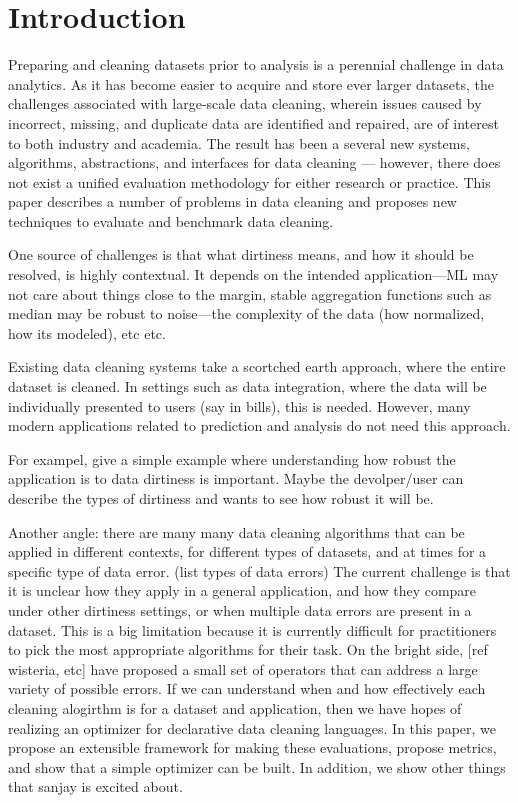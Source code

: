 \section{Introduction}
Preparing and cleaning datasets prior to analysis is a perennial challenge in data analytics. As it has become easier to acquire and store ever larger datasets, the challenges associated with large-scale data cleaning, wherein issues caused by incorrect, missing, and duplicate data are identified and repaired, are of interest to both industry and academia. The result has been a several new systems, algorithms, abstractions, and interfaces for data cleaning --- however, there does not exist a unified evaluation methodology for either research or practice. This paper describes a number of problems in data cleaning and proposes new techniques to evaluate and benchmark data cleaning.

One source of challenges is that what dirtiness means, and how it should be resolved, is highly contextual.  It depends on the intended application---ML may not care about things close to the margin, stable aggregation functions such as median may be robust to noise---the complexity of the data (how normalized, how its modeled), etc etc.

Existing data cleaning systems take a scortched earth approach, where the entire dataset is cleaned.  In settings such as data integration, where the data will be individually presented to users (say in bills), this is needed.  However, many modern applications related to prediction and analysis do not need this approach. 

For exampel, give a simple example where understanding how robust the application is to data dirtiness is important.  Maybe the devolper/user can describe the types of dirtiness and wants to see how robust it will be.  

Another angle:  there are many many data cleaning algorithms that can be applied in different contexts, for different types of datasets, and at times for a specific type of data error.  (list types of data errors)   The current challenge is that it is unclear how they apply in a general application, and how they compare under other dirtiness settings, or when multiple data errors are present in a dataset.  This is a big limitation because it is currently difficult for practitioners to pick the most appropriate algorithms for their task.    On the bright side, [ref wisteria, etc] have proposed a small set of operators that can address a large variety of possible errors.  If we can understand when and how effectively each cleaning alogirthm is for a dataset and application, then we have hopes of realizing an optimizer for declarative data cleaning languages.  In this paper, we propose an extensible framework for making these evaluations, propose metrics, and show that a simple optimizer can be built.  In addition, we show other things that sanjay is excited about.

